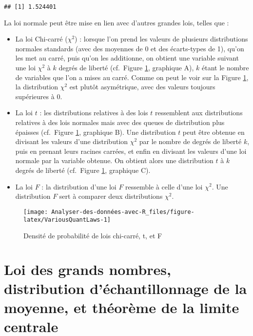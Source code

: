 \documentclass[
]{book}
\begin{document}
\begin{verbatim}
## [1] 1.524401
\end{verbatim}

La loi normale peut être mise en lien avec d'autres grandes lois, telles que :

\begin{itemize}
\item
  La loi Chi-carré (\(\chi^2\)) : lorsque l'on prend les valeurs de plusieurs distributions normales standards (avec des moyennes de 0 et des écarts-types de 1), qu'on les met au carré, puis qu'on les additionne, on obtient une variable suivant une loi \(\chi^2\) à \(k\) degrés de liberté (cf.~Figure \ref{fig:VariousQuantLaws}, graphique A), \(k\) étant le nombre de variables que l'on a mises au carré. Comme on peut le voir sur la Figure \ref{fig:VariousQuantLaws}, la distribution \(\chi^2\) est plutôt asymétrique, avec des valeurs toujours supérieures à 0.
\item
  La loi \(t\) : les distributions relatives à des lois \(t\) ressemblent aux distributions relatives à des lois normales mais avec des queues de distribution plus épaisses (cf.~Figure \ref{fig:VariousQuantLaws}, graphique B). Une distribution \(t\) peut être obtenue en divisant les valeurs d'une distribution \(\chi^2\) par le nombre de degrés de liberté \(k\), puis en prenant leurs racines carrées, et enfin en divisant les valeurs d'une loi normale par la variable obtenue. On obtient alors une distribution \(t\) à \(k\) degrés de liberté (cf.~Figure \ref{fig:VariousQuantLaws}, graphique C).
\item
  La loi \(F\) : la distribution d'une loi \(F\) ressemble à celle d'une loi \(\chi^2\). Une distribution \(F\) sert à comparer deux distributions \(\chi^2\).
\end{itemize}

\begin{figure}

{\centering \texttt{[image: Analyser-des-données-avec-R\_files/figure-latex/VariousQuantLaws-1]} 

}

\caption{Densité de probabilité de lois chi-carré, t, et F}\label{fig:VariousQuantLaws}
\end{figure}

\hypertarget{loi-des-grands-nombres-distribution-duxe9chantillonnage-de-la-moyenne-et-thuxe9oruxe8me-de-la-limite-centrale}{%
\section{Loi des grands nombres, distribution d'échantillonnage de la moyenne, et théorème de la limite centrale}\label{loi-des-grands-nombres-distribution-duxe9chantillonnage-de-la-moyenne-et-thuxe9oruxe8me-de-la-limite-centrale}}
\end{document}
